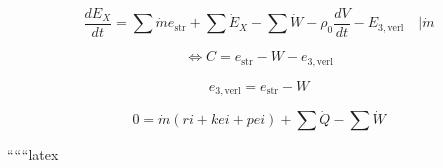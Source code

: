  \quad {} \rightarrow {} \quad {}

\[
\frac{dE_X}{dt} = \sum \dot{m} e_{\text{str}} + \sum \dot{E}_X - \sum \dot{W} - \rho_0 \frac{dV}{dt} - E_{3, \text{verl}} \quad \Bigg| \dot{m}
\]

\[
\Leftrightarrow C = e_{\text{str}} - W - e_{3, \text{verl}}
\]

\[
e_{3, \text{verl}} = e_{\text{str}} - W
\]

 \quad {} \rightarrow {}

\[
0 = \dot{m} (ri + kei + pei) + \sum \dot{Q} - \sum \dot{W}
\]

``````latex


